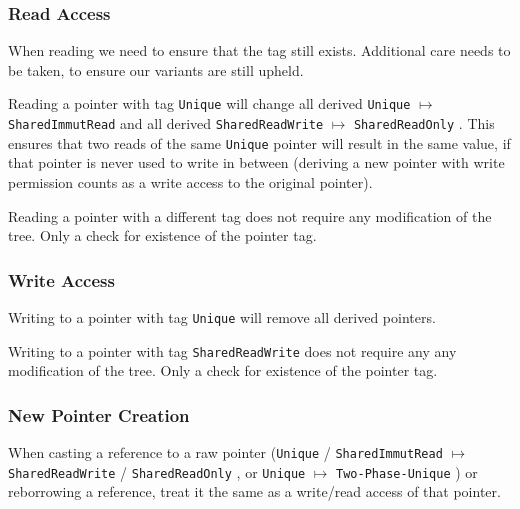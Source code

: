 \documentclass[]{article}
\newcommand{\SHRW}{\texttt{SharedReadWrite} }
\newcommand{\SHRO}{\texttt{SharedReadOnly} }
\newcommand{\SHIR}{\texttt{SharedImmutRead} }
\newcommand{\UNQ}{\texttt{Unique} }
\newcommand{\TPU}{\texttt{Two-Phase-Unique} }
\begin{document}
\subsubsection{Read Access}

When reading we need to ensure that the tag still exists. Additional care needs to be taken, to ensure our variants are still upheld.

Reading a pointer with tag \UNQ will change all derived \UNQ $\mapsto$ \SHIR and all derived \SHRW $\mapsto$ \SHRO. This ensures that two reads of the same \UNQ pointer will result in the same value, if that pointer is never used to write in between (deriving a new pointer with write permission counts as a write access to the original pointer).

Reading a pointer with a different tag does not require any modification of the tree. Only a check for existence of the pointer tag.

\subsubsection{Write Access}

Writing to a pointer with tag \UNQ will remove all derived pointers.

Writing to a pointer with tag \SHRW does not require any any modification of the tree. Only a check for existence of the pointer tag.

\subsubsection{New Pointer Creation}
When casting a reference to a raw pointer (\UNQ / \SHIR $\mapsto$ \SHRW / \SHRO, or \UNQ $\mapsto$ \TPU)  or reborrowing a reference, treat it the same as a write/read access of that pointer.
\end{document}
